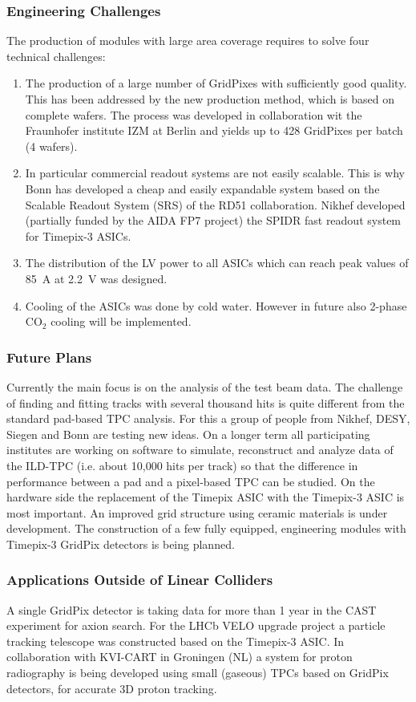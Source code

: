 \subsubsection{Engineering Challenges}
The production of modules with large area coverage requires to solve four
technical challenges:
\begin{enumerate}
\item The production of a large number of GridPixes with sufficiently good
quality. This has been addressed by the new production method, which is based
on complete wafers. The process was developed in collaboration wit the
Fraunhofer institute IZM at Berlin and yields up to 428 GridPixes per batch (4 wafers).

\item In particular commercial readout systems are not easily scalable. This is why Bonn has developed a cheap and easily expandable system based on the Scalable Readout System (SRS) of the RD51 collaboration.
Nikhef developed (partially funded by the AIDA FP7 project) the SPIDR fast readout system for Timepix-3 ASICs.

\item The distribution of the LV power to all ASICs which can reach peak values
of \SI{85}{\ampere} at \SI{2.2}{\volt} was designed.

\item Cooling of the ASICs was done by cold water. However in future also 2-phase CO$_2$ cooling will be implemented.
\end{enumerate}

\subsubsection{Future Plans}
Currently the main focus is on the analysis of the test beam data. The
challenge of finding and fitting tracks with several thousand hits is quite
different from the standard pad-based TPC analysis. For this a group of people
from Nikhef, DESY, Siegen and Bonn are testing new ideas. On a longer term all
participating institutes are working on software to simulate, reconstruct and
analyze data of the ILD-TPC (i.e. about 10,000 hits per track) so that the
difference in performance between a pad and a pixel-based TPC can be studied.
On the hardware side the replacement of the Timepix ASIC with the Timepix-3
ASIC is most important.
An improved grid structure using ceramic materials is under development.
The construction of a few fully equipped, engineering modules with Timepix-3
GridPix detectors is being planned.

\subsubsection{Applications Outside of Linear Colliders}
A single GridPix detector is taking data for more than 1 year in the CAST
experiment for axion search.
For the LHCb VELO upgrade project a particle tracking telescope was constructed
based on the Timepix-3 ASIC.
In collaboration with KVI-CART in Groningen (NL) a system for proton radiography
is being developed using small (gaseous) TPCs based on GridPix detectors, for
accurate 3D proton tracking.
